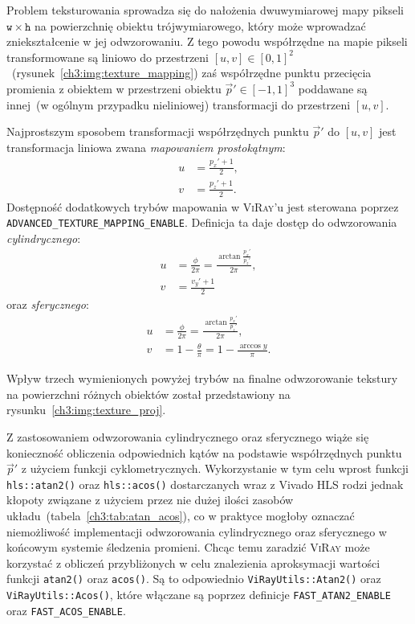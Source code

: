 \begin{enumerate}
Problem teksturowania sprowadza się do nałożenia dwuwymiarowej mapy pikseli $\mathtt{w}\times\mathtt{h}$ na powierzchnię obiektu trójwymiarowego, który może wprowadzać zniekształcenie w jej odwzorowaniu. Z tego powodu współrzędne na mapie pikseli transformowane są liniowo do przestrzeni $[u, v] \in [0, 1]^2$~(rysunek~\ref{ch3:img:texture_mapping}) zaś współrzędne punktu przecięcia promienia z obiektem w przestrzeni obiektu $\vec{p}'\in[-1, 1]^3$ poddawane są innej~(w ogólnym przypadku nieliniowej) transformacji do przestrzeni $[u, v]$. 



Najprostszym sposobem transformacji współrzędnych punktu $\vec{p}'$ do $[u,v]$ jest transformacja liniowa zwana \textit{mapowaniem prostokątnym}:
\begin{align*}
u &= \frac{p_x' + 1}{2},\\
v &= \frac{p_z' + 1}{2}.
\end{align*}
Dostępność dodatkowych trybów mapowania w \textsc{ViRay}'u jest sterowana poprzez \texttt{ADVANCED\_TEXTURE\_MAPPING\_ENABLE}. Definicja ta daje dostęp do odwzorowania \textit{cylindrycznego}:
\begin{align*}
u &= \frac{\phi}{2\pi} = \frac{\arctan\frac{p_x'}{p_z'}}{2\pi},\\
v &= \frac{v_y' + 1}{2}
\end{align*} 
oraz \textit{sferycznego}:
\begin{align*}
u &= \frac{\phi}{2\pi} = \frac{\arctan\frac{p_x'}{p_z'}}{2\pi},\\
v &= 1 - \frac{\theta}{\pi} = 1 - \frac{\arccos y}{\pi}.
\end{align*} 

Wpływ trzech wymienionych powyżej trybów na finalne odwzorowanie tekstury na powierzchni różnych obiektów został przedstawiony na rysunku~\ref{ch3:img:texture_proj}.



Z zastosowaniem odwzorowania cylindrycznego oraz sferycznego wiąże się konieczność obliczenia odpowiednich kątów na podstawie współrzędnych punktu $\vec{p}'$ z użyciem funkcji cyklometrycznych. Wykorzystanie w tym celu wprost funkcji \texttt{hls::atan2()} oraz \texttt{hls::acos()} dostarczanych wraz z Vivado HLS rodzi jednak kłopoty związane z użyciem przez nie dużej ilości zasobów układu~(tabela~\ref{ch3:tab:atan_acos}), co w praktyce mogłoby oznaczać niemożliwość implementacji odwzorowania cylindrycznego oraz sferycznego w końcowym systemie śledzenia promieni. Chcąc temu zaradzić \textsc{ViRay} może korzystać z obliczeń przybliżonych w celu znalezienia aproksymacji wartości funkcji \texttt{atan2()} oraz \texttt{acos()}. Są to odpowiednio \texttt{ViRayUtils::Atan2()} oraz \texttt{ViRayUtils::Acos()}, które włączane są poprzez definicje \texttt{FAST\_ATAN2\_ENABLE} oraz \texttt{FAST\_ACOS\_ENABLE}.


\end{enumerate}
